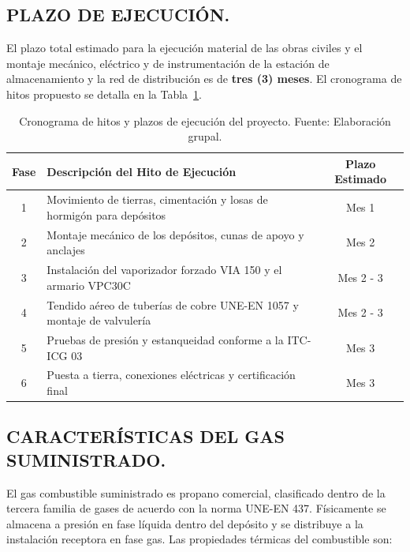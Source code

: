 \documentclass[12pt]{article}
\begin{document}
        \subsection{PLAZO DE EJECUCIÓN.}
        El plazo total estimado para la ejecución material de las obras civiles y el montaje mecánico, eléctrico y de instrumentación de la estación de almacenamiento y la red de distribución es de \textbf{tres (3) meses}. El cronograma de hitos propuesto se detalla en la Tabla~\ref{tab:cronograma}.
        
        \begin{table}[H]
            \centering
            \caption{Cronograma de hitos y plazos de ejecución del proyecto. Fuente: Elaboración grupal.}
            \label{tab:cronograma}
            \begin{tabularx}{\textwidth}{c X c}
                \toprule
                \textbf{Fase} & \textbf{Descripción del Hito de Ejecución} & \textbf{Plazo Estimado} \\
                \midrule
                1 & Movimiento de tierras, cimentación y losas de hormigón para depósitos & Mes 1 \\
                2 & Montaje mecánico de los depósitos, cunas de apoyo y anclajes & Mes 2 \\
                3 & Instalación del vaporizador forzado VIA 150 y el armario VPC30C & Mes 2 - 3 \\
                4 & Tendido aéreo de tuberías de cobre UNE-EN 1057 y montaje de valvulería & Mes 2 - 3 \\
                5 & Pruebas de presión y estanqueidad conforme a la ITC-ICG 03 & Mes 3 \\
                6 & Puesta a tierra, conexiones eléctricas y certificación final & Mes 3 \\
                \bottomrule
            \end{tabularx}
        \end{table}

        \subsection{CARACTERÍSTICAS DEL GAS SUMINISTRADO.}
        El gas combustible suministrado es propano comercial, clasificado dentro de la tercera familia de gases de acuerdo con la norma UNE-EN 437. Físicamente se almacena a presión en fase líquida dentro del depósito y se distribuye a la instalación receptora en fase gas. Las propiedades térmicas del combustible son:
        
\end{document}
